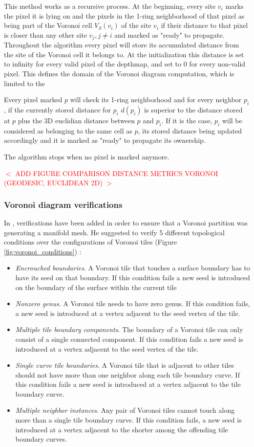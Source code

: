 \documentclass[11pt,fleqn]{book} %
\newcommand{\arnaud}[1]{\textcolor{red}{$<$ #1 $>$}}
\begin{document}
This method works as a recursive process. 
At the beginning, every site $v_i$ marks the pixel it is lying on and the pixels in the 1-ring neighborhood of that pixel as being part of the Voronoi cell $V_S(v_i)$ of the site $v_i$ if their distance to that pixel is closer than any other site $v_j, j \neq i$ and marked as "ready" to propagate.
Throughout the algorithm every pixel will store its accumulated distance from the site of the Voronoi cell it belongs to. 
At the initialization this distance is set to infinity for every valid pixel of the depthmap, and set to 0 for every non-valid pixel.
This defines the domain of the Voronoi diagram computation, which is limited to the 

Every pixel marked $p$ will check its 1-ring neighborhood and for every neighbor $p_i$, if the currently stored distance for $p_i$ $d(p_i)$ is superior to the distance stored at $p$ plus the 3D euclidian distance between $p$ and $p_i$. 
If it is the case, $p_i$ will be considered as belonging to the same cell as $p$, its stored distance being updated accordingly and it is marked as "ready" to propagate its ownership.

The algorithm stops when no pixel is marked anymore.

\arnaud{ADD FIGURE COMPARISON DISTANCE METRICS VORONOI (GEODESIC, EUCLIDEAN 2D)}

\subsubsection{Voronoi diagram verifications}
In \cite{Gus07}, verifications have been added in order to ensure that a Voronoi partition was generating a manifold mesh.
He suggested to verify 5 different topological conditions over the configurations of Voronoi tiles (Figure \ref{fig:voronoi_conditions}) : 
\begin{itemize}
	\item \textit{Encrouched boundaries}. A Voronoi tile that touches a surface boundary has to have its seed on that boundary. 
	If this condition fails a new seed is introduced on the boundary of the surface within the current tile
	\item \textit{Nonzero genus}. A Voronoi tile needs to have zero genus. If this condition fails, a new seed is introduced at a vertex adjacent to the seed vertex of the tile.
	\item \textit{Multiple tile boundary components}. The boundary of a Voronoi tile can only consist of a single connected component. If this condition fails a new seed is introduced at a vertex adjacent to the seed vertex of the tile.
	\item \textit{Single curve tile boundaries}. A Voronoi tile that is adjacent to other tiles should not have more than one neighbor along each tile boundary curve. If this condition fails a new seed is introduced at a vertex adjacent to the tile boundary curve.
	\item \textit{Multiple neighbor instances}. Any pair of Voronoi tiles cannot touch along more than a single tile boundary curve. If this condition fails, a new seed is introduced at a vertex adjacent to the shorter among the offending tile boundary curves.
\end{itemize}
\end{document}
